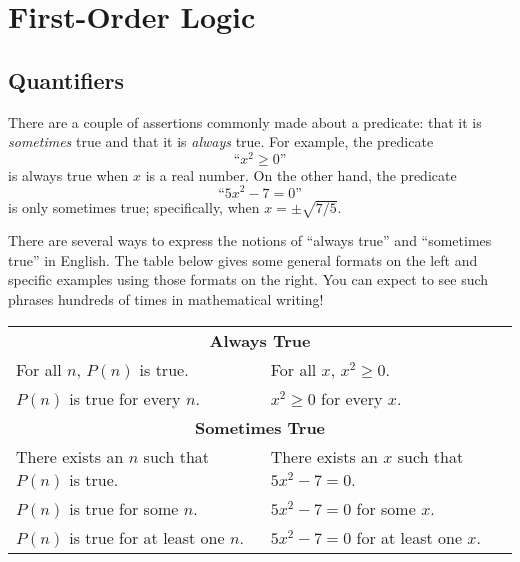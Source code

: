 \chapter{First-Order Logic}

\newcommand{\solves}{\text{Solves}}
\newcommand{\probs}{\text{Probs}}
\newcommand{\even}{\text{Evens}}
\newcommand{\primes}{\text{Primes}}

\section{Quantifiers}

There are a couple of assertions commonly made about a predicate: that it
is \textit{sometimes} true and that it is \textit{always} true.  For
example, the predicate
%
\[
\text{``$x^2 \geq 0$''}
\]
%
is always true when $x$ is a real number.  On the other hand, the
predicate
%
\[
\text{``$5x^2 - 7 = 0$''}
\]
%
is only sometimes true; specifically, when $x = \pm \sqrt{7/5}$.

There are several ways to express the notions of ``always true'' and
``sometimes true'' in English.  The table below gives some general
formats on the left and specific examples using those formats on the
right.  You can expect to see such phrases hundreds of times in
mathematical writing!
%
\begin{center}
\begin{tabular}{ll}
\multicolumn{2}{c}{\textbf{Always True}} \\[1ex]
For all $n$, $P(n)$ is true. & For all $x$, $x^2 \geq 0$. \\
$P(n)$ is true for every $n$. & $x^2 \geq 0$ for every $x$. \\[2ex]
\multicolumn{2}{c}{\textbf{Sometimes True}} \\[1ex]
There exists an $n$ such that $P(n)$ is true. & There exists an $x$ such that $5x^2 - 7 = 0$.\\
$P(n)$ is true for some $n$. & $5x^2 - 7 = 0$ for some $x$.\\
$P(n)$ is true for at least one $n$. & $5x^2-7=0$ for at least one $x$.
\end{tabular}
\end{center}

